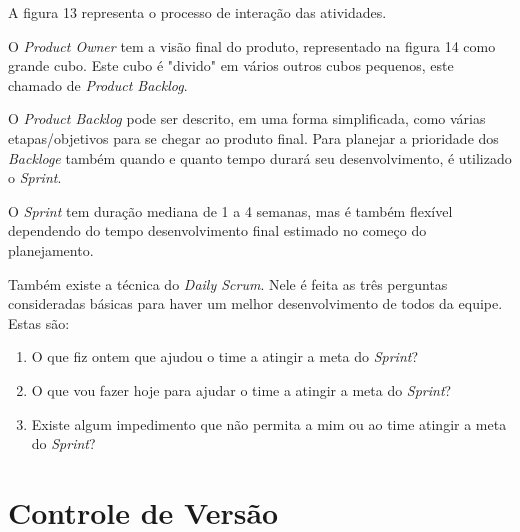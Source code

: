 		A figura 13 representa o processo de interação das atividades.


	\begin{figure}[h!]
		\centering
	\end{figure}
	
O \textit{Product Owner} tem a visão final do produto, representado na figura 14 como grande cubo. Este cubo é "divido" em vários outros cubos pequenos, este chamado de \textit{Product Backlog}.

O \textit{Product Backlog} pode ser descrito, em uma forma simplificada, como várias etapas/objetivos para se chegar ao produto final.
Para planejar a prioridade dos \textit{Backloge} também quando e quanto tempo durará seu desenvolvimento, é utilizado o \textit{Sprint}.

O \textit{Sprint} tem duração mediana de 1 a 4 semanas, mas é também flexível dependendo do tempo desenvolvimento final estimado no começo do planejamento.

Também existe a técnica do \textit{Daily Scrum}. Nele é feita as três perguntas consideradas básicas para haver um melhor desenvolvimento de todos da equipe.
Estas são:

\begin{enumerate}
   \item O que fiz ontem que ajudou o time a atingir a meta do \textit{Sprint}?
   \item O que vou fazer hoje para ajudar o time a atingir a meta do \textit{Sprint}?
   \item  Existe algum impedimento que não permita a mim ou ao time atingir a meta do \textit{Sprint}?
 \end{enumerate}
 \cite{scrum}
 

\section{Controle de Versão}
\label{sec:Controle-de-Versão}

